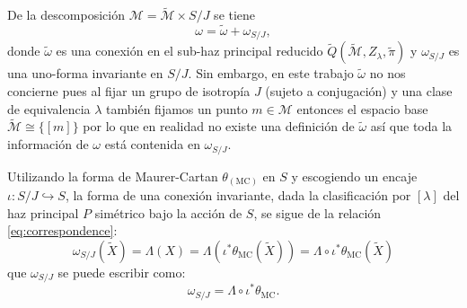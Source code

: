 De la descomposici\'{o}n $\mathcal{M} = \mathcal{\tilde{M}} \times S/J$ se tiene
%
\begin{equation}
\omega = \tilde{\omega} + \omega_{S/J},
\end{equation}
%
donde $\tilde{\omega}$ es una conexi\'{o}n en el sub-haz principal reducido $\tilde{Q}(\tilde{\mathcal{M}}, Z_{\lambda}, \tilde{\pi})$ y $\omega_{S/J}$ es una uno-forma invariante en $S/J$. Sin embargo, en este trabajo $\tilde{\omega}$ no nos concierne pues al fijar un grupo de isotrop\'{i}a $J$ (sujeto a conjugaci\'{o}n) y una clase de equivalencia $\lambda$ tambi\'{e}n fijamos un punto $m \in \mathcal{M}$ entonces el espacio base $\tilde{\mathcal{M}} \cong \{[m]\}$ por lo que en realidad no existe una definici\'{o}n de $\tilde{\omega}$ as\'{i} que toda la informaci\'{o}n de $\omega$ est\'{a} contenida en $\omega_{S/J}$.

Utilizando la forma de Maurer-Cartan $\theta_{(\mathrm{MC})}$ en $S$ y escogiendo un encaje $\iota: S/J \hookrightarrow S$, la forma de una conexi\'{o}n invariante, dada la clasificaci\'{o}n por $[\lambda]$ del haz principal $P$ sim\'{e}trico bajo la acci\'{o}n de $S$, se sigue de la relaci\'{o}n \eqref{eq:correspondence}:
%
\begin{equation*}
\omega_{S/J} (\tilde{X}) = \Lambda (X) = \Lambda (\iota^{*} \theta_{\mathrm{MC}} (\tilde{X})) = \Lambda \circ \iota^{*} \theta_{\mathrm{MC}} (\tilde{X})
\end{equation*}
%
que $\omega_{S/J}$ se puede escribir como:
%
\begin{equation}
\omega_{S/J} = \Lambda \circ \iota^{*} \theta_{\mathrm{MC}}.
\end{equation}